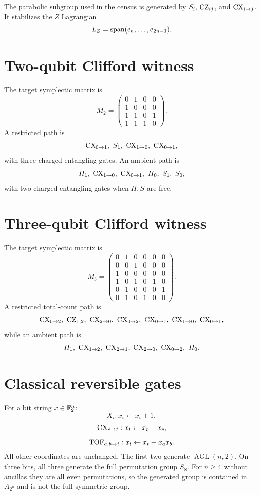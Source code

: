 The parabolic subgroup used in the census is generated by $S_i$, $\operatorname{CZ}_{ij}$, and $\operatorname{CX}_{i\to j}$.  It stabilizes the $Z$ Lagrangian
\[
L_Z=\operatorname{span}(e_n,\ldots,e_{2n-1}).
\]

\section{Two-qubit Clifford witness}
The target symplectic matrix is
\[
M_2=
\begin{pmatrix}
0&1&0&0\\
1&0&0&0\\
1&1&0&1\\
1&1&1&0
\end{pmatrix}.
\]
A restricted path is
\[
\CX_{0\to1},\ S_1,\ \CX_{1\to0},\ \CX_{0\to1},
\]
with three charged entangling gates.  An ambient path is
\[
H_1,\ \CX_{1\to0},\ \CX_{0\to1},\ H_0,\ S_1,\ S_0,
\]
with two charged entangling gates when $H,S$ are free.

\section{Three-qubit Clifford witness}
The target symplectic matrix is
\[
M_3=
\begin{pmatrix}
0&1&0&0&0&0\\
0&0&1&0&0&0\\
1&0&0&0&0&0\\
1&0&1&0&1&0\\
0&1&0&0&0&1\\
0&1&0&1&0&0
\end{pmatrix}.
\]
A restricted total-count path is
\[
\CX_{0\to2},\ \CZ_{1,2},\ \CX_{2\to0},\ \CX_{0\to2},
\ \CX_{0\to1},\ \CX_{1\to0},\ \CX_{0\to1},
\]
while an ambient path is
\[
H_1,\ \CX_{1\to2},\ \CX_{2\to1},\ \CX_{2\to0},\ \CX_{0\to2},\ H_0.
\]

\section{Classical reversible gates}
For a bit string $x\in\mathbb F_2^n$:
\[
X_i:x_i\leftarrow x_i+1,
\]
\[
\operatorname{CX}_{c\to t}:x_t\leftarrow x_t+x_c,
\]
\[
\operatorname{TOF}_{a,b\to t}:x_t\leftarrow x_t+x_ax_b.
\]
All other coordinates are unchanged.  The first two generate $\operatorname{AGL}(n,2)$.  On three bits, all three generate the full permutation group $S_8$.  For $n\ge4$ without ancillas they are all even permutations, so the generated group is contained in $A_{2^n}$ and is not the full symmetric group.

